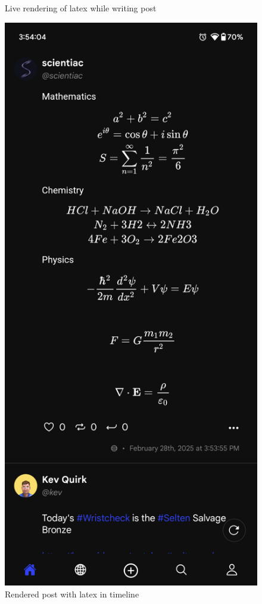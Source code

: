 \begin{figure}[htbp]
\begin{minipage}[b]{0.45\linewidth}
    \caption{Live rendering of latex while writing post}
    \label{fig:writing_post}
  \end{minipage}
  \hfill %
  \begin{minipage}[b]{0.45\linewidth}
    \centering
    \includegraphics[width=\linewidth]{Graphics/postintimeline.png}
    \caption{Rendered post with latex in timeline}
    \label{fig:post_in_timeline}
  \end{minipage}
\end{figure}

